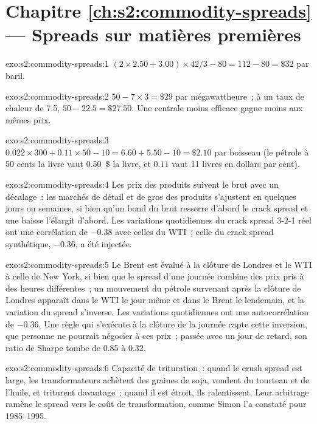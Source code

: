 \section*{Chapitre \ref{ch:s2:commodity-spreads} --- Spreads sur matières premières}

\begin{solution}{exo:s2:commodity-spreads:1}
$(2 \times 2.50 + 3.00) \times 42 / 3 - 80 = 112 - 80 = \$32$ par baril.
\end{solution}

\begin{solution}{exo:s2:commodity-spreads:2}
$50 - 7 \times 3 = \$29$ par mégawattheure~; à un taux de chaleur de 7.5, $50 - 22.5 = \$27.50$. Une centrale moins efficace gagne moins aux mêmes prix.
\end{solution}

\begin{solution}{exo:s2:commodity-spreads:3}
$0.022 \times 300 + 0.11 \times 50 - 10 = 6.60 + 5.50 - 10 = \$2.10$ par boisseau (le pétrole à 50 cents la livre vaut 0.50~\$ la livre, et $0.11$ vaut 11
livres en dollars par cent).
\end{solution}

\begin{solution}{exo:s2:commodity-spreads:4}
Les prix des produits suivent le brut avec un décalage~: les marchés de détail et de gros des produits s'ajustent en quelques jours ou semaines, si bien qu'un bond du brut resserre d'abord le crack spread et
une baisse l'élargit d'abord. Les variations quotidiennes du crack spread 3-2-1 réel ont une corrélation de $-0.38$ avec celles du WTI~; celle du crack spread synthétique, $-0.36$, a été injectée.
\end{solution}

\begin{solution}{exo:s2:commodity-spreads:5}
Le Brent est évalué à la clôture de Londres et le WTI à celle de New York, si bien que le spread d'une journée combine des prix pris à des heures différentes~; un mouvement du pétrole survenant après la
clôture de Londres apparaît dans le WTI le jour même et dans le Brent le lendemain, et la variation du spread s'inverse. Les variations quotidiennes ont une autocorrélation de $-0.36$. Une règle
qui s'exécute à la clôture de la journée capte cette inversion, que personne ne pourrait négocier à ces prix~; passée avec un jour de retard, son ratio de Sharpe tombe de 0.85
à 0.32.
\end{solution}

\begin{solution}{exo:s2:commodity-spreads:6}
Capacité de trituration~: quand le crush spread est large, les transformateurs achètent des graines de soja, vendent du tourteau et de l'huile, et triturent davantage~; quand il est étroit, ils ralentissent. Leur
arbitrage ramène le spread vers le coût de transformation, comme Simon l'a constaté pour 1985--1995.
\end{solution}

